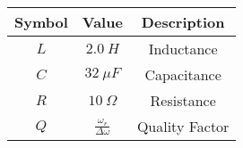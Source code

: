 

\begin{tabular}{|c|c|c|}
    \hline
     \textbf{Symbol} & \textbf{Value} &
     \textbf{Description}\\
    \hline
     $L$ &  $2.0\ H$ & Inductance\\
    \hline 
     $C$ &  $32\ \mu F$ & Capacitance \\
    \hline
     $R$ &  $10\ \Omega$ & Resistance\\
    \hline
     $Q$ & $\frac{\omega_r}{\Delta \omega}$ & Quality Factor\\[6pt]
    \hline
\end{tabular}
